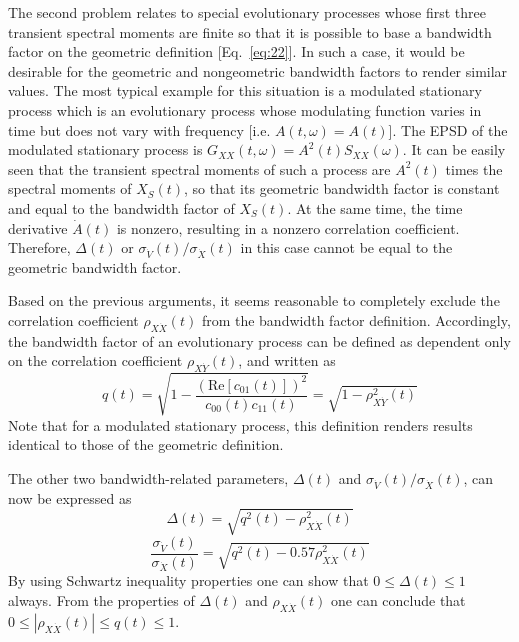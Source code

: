 \documentclass{article}
\begin{document}
The second problem relates to special evolutionary processes whose first three
transient spectral moments are finite so that it is possible to base a
bandwidth factor on the geometric definition [Eq.~\eqref{eq:22}]. In such a
case, it would be desirable for the geometric and nongeometric bandwidth
factors to render similar values. The most typical example for this situation
is a modulated stationary process which is an evolutionary process whose
modulating function varies in time but does not vary with frequency [i.e. $A
(t, \omega) = A (t)$]. The EPSD of the modulated stationary process is $G_{XX}
(t, \omega) = A^2 (t) S_{XX} (\omega)$. It can be easily seen that the
transient spectral moments of such a process are $A^2 (t)$ times the spectral
moments of $X_S (t)$, so that its geometric bandwidth factor is constant and
equal to the bandwidth factor of $X_S (t)$. At the same time, the time
derivative $\dot{A} (t)$ is nonzero, resulting in a nonzero correlation
coefficient. Therefore, $\Delta (t)$ or $\sigma_{\dot{V}} (t) /
\sigma_{\dot{X}} (t)$ in this case cannot be equal to the geometric bandwidth
factor.

Based on the previous arguments, it seems reasonable to completely exclude the
correlation coefficient $\rho_{X \dot{X}} (t)$ from the bandwidth factor
definition. Accordingly, the bandwidth factor of an evolutionary process can
be defined as dependent only on the correlation coefficient $\rho_{X \dot{Y}}
(t)$, and written as
\begin{equation}
  q (t) = \sqrt{1 - \frac{(\mathrm{Re} [c_{01} (t)])^2}{c_{00} (t) c_{11}
  (t)}} = \sqrt{1 - \rho_{X \dot{Y}}^2 (t)} \label{eq:70}
\end{equation}
Note that for a modulated stationary process, this definition renders results
identical to those of the geometric definition.

The other two bandwidth-related parameters, $\Delta (t)$ and $\sigma_{\dot{V}}
(t) / \sigma_{\dot{X}} (t)$, can now be expressed as
\begin{equation}
  \Delta (t) = \sqrt{q^2 (t) - \rho_{X \dot{X}}^2 (t)} \label{eq:71}
\end{equation}
\begin{equation}
  \frac{\sigma_{\dot{V}} (t)}{\sigma_{\dot{X}} (t)} = \sqrt{q^2 (t) - 0.57
  \rho_{X \dot{X}}^2 (t)}
\end{equation}
By using Schwartz inequality properties one can show that $0 \leqslant \Delta
(t) \leqslant 1$ always. From the properties of $\Delta (t)$ and $\rho_{X
\dot{X}} (t)$ one can conclude that $0 \leqslant | \rho_{X \dot{X}} (t) |
\leqslant q (t) \leqslant 1$.
\end{document}
